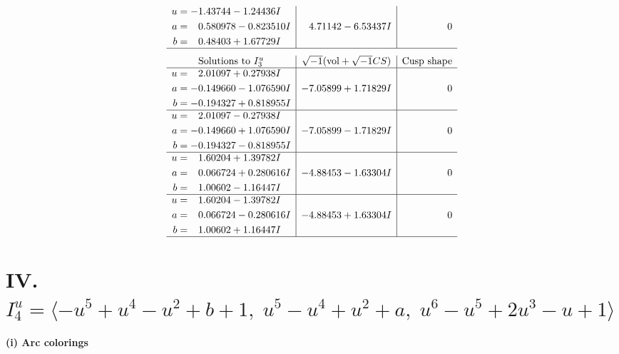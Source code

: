 \documentclass[1p]{elsarticle_modified}
\theoremstyle{definition}
\newcommand{\I}{\sqrt{-1}}
\begin{document}
$$\begin{array}{c|c|c}
\begin{aligned}
u &= -1.43744 - 1.24436 I \\
a &= \phantom{-}0.580978 - 0.823510 I \\
b &= \phantom{-}0.48403 + 1.67729 I\end{aligned}
 & \phantom{-}4.71142 - 6.53437 I & \phantom{-0.000000 } 0\\
 \hline 
 \end{array}$$\newpage$$\begin{array}{c|c|c}  
\text{Solutions to }I^u_{3}& \I (\text{vol} + \sqrt{-1}CS) & \text{Cusp shape}\\
 \hline 
\begin{aligned}
u &= \phantom{-}2.01097 + 0.27938 I \\
a &= -0.149660 - 1.076590 I \\
b &= -0.194327 + 0.818955 I\end{aligned}
 & -7.05899 + 1.71829 I & \phantom{-0.000000 } 0 \\ \hline\begin{aligned}
u &= \phantom{-}2.01097 - 0.27938 I \\
a &= -0.149660 + 1.076590 I \\
b &= -0.194327 - 0.818955 I\end{aligned}
 & -7.05899 - 1.71829 I & \phantom{-0.000000 } 0 \\ \hline\begin{aligned}
u &= \phantom{-}1.60204 + 1.39782 I \\
a &= \phantom{-}0.066724 + 0.280616 I \\
b &= \phantom{-}1.00602 - 1.16447 I\end{aligned}
 & -4.88453 - 1.63304 I & \phantom{-0.000000 } 0 \\ \hline\begin{aligned}
u &= \phantom{-}1.60204 - 1.39782 I \\
a &= \phantom{-}0.066724 - 0.280616 I \\
b &= \phantom{-}1.00602 + 1.16447 I\end{aligned}
 & -4.88453 + 1.63304 I & \phantom{-0.000000 } 0\\
 \hline 
 \end{array}$$\newpage\newpage\renewcommand{\arraystretch}{1}
\centering \section*{IV. $I^u_{4}= \langle - u^5+u^4- u^2+b+1,\;u^5- u^4+u^2+a,\;u^6- u^5+2 u^3- u+1 \rangle$}
\flushleft \textbf{(i) Arc colorings}\\
\end{document}
